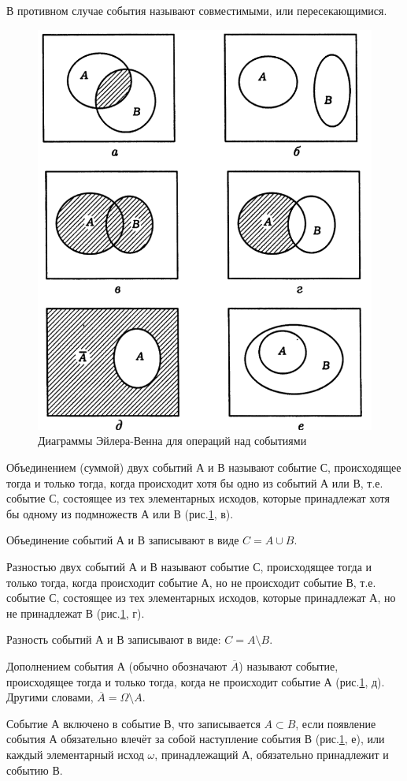 В противном случае события называют совместимыми, или пересекающимися.

\begin{figure}[h!]
  \centering
  \includegraphics[width=.7\textwidth]{./pictures/2.png}
  \caption{Диаграммы Эйлера-Венна для операций над событиями}
  \label{fig:2}
\end{figure}

Объединением (суммой) двух событий А и В называют событие С,
происходящее тогда и только тогда,
когда происходит хотя бы одно из событий А или В, т.е.
событие С, состоящее из тех элементарных исходов, которые принадлежат хотя бы одному из подмножеств А или В (рис.\ref{fig:2}, в).

Объединение событий А и В записывают в виде $ C = A \cup B $.

Разностью двух событий А и В называют событие С,
происходящее тогда и только тогда,
когда происходит событие А,
но не происходит событие В, т.е. событие С, состоящее из тех элементарных исходов, которые принадлежат А, но не принадлежат В (рис.\ref{fig:2}, г).

Разность событий А и В записывают в виде: $ C = A \setminus B $.

Дополнением события А (обычно обозначают $ \overline{A} $) называют событие, происходящее тогда и только тогда, когда не происходит событие А (рис.\ref{fig:2}, д).
Другими словами, $ \overline{A} = \Omega \setminus A $.

Событие А включено в событие В,
что записывается $ A \subset B $,
если появление события А обязательно влечёт за собой наступление события В (рис.\ref{fig:2}, е),
или каждый элементарный исход $ \omega $, принадлежащий А, обязательно принадлежит и событию В.

